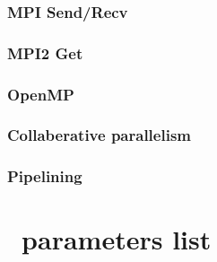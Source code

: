 \documentclass{book}
\begin{document}
\subsection{MPI Send/Recv}

\subsection{MPI2 Get}

\subsection{OpenMP}

\subsection{Collaberative parallelism}

\subsection{Pipelining}

\appendix
\newcommand{\parametersize}{\scriptsize}

\chapter{\enzo\ parameters list}
\end{document}
